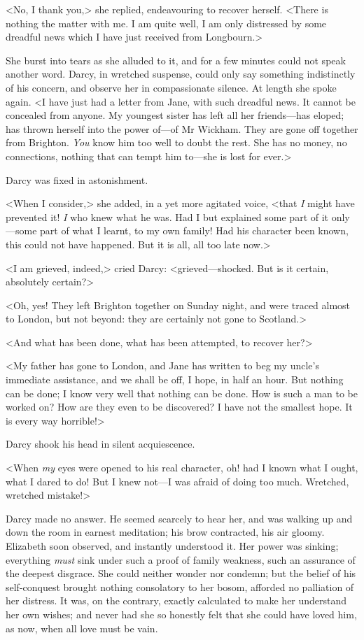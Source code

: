 <No, I thank you,> she replied, endeavouring to recover herself. <There is nothing the matter with me. I am quite well, I am only distressed by some dreadful news which I have just received from Longbourn.>

She burst into tears as she alluded to it, and for a few minutes could not speak another word. Darcy, in wretched suspense, could only say something indistinctly of his concern, and observe her in compassionate silence. At length she spoke again. <I have just had a letter from Jane, with such dreadful news. It cannot be concealed from anyone. My youngest sister has left all her friends—has eloped; has thrown herself into the power of—of Mr Wickham. They are gone off together from Brighton. \textit{You} know him too well to doubt the rest. She has no money, no connections, nothing that can tempt him to—she is lost for ever.>

Darcy was fixed in astonishment.

<When I consider,> she added, in a yet more agitated voice, <that \textit{I} might have prevented it! \textit{I} who knew what he was. Had I but explained some part of it only—some part of what I learnt, to my own family! Had his character been known, this could not have happened. But it is all, all too late now.>

<I am grieved, indeed,> cried Darcy: <grieved—shocked. But is it certain, absolutely certain?>

<Oh, yes! They left Brighton together on Sunday night, and were traced almost to London, but not beyond: they are certainly not gone to Scotland.>

<And what has been done, what has been attempted, to recover her?>

<My father has gone to London, and Jane has written to beg my uncle's immediate assistance, and we shall be off, I hope, in half an hour. But nothing can be done; I know very well that nothing can be done. How is such a man to be worked on? How are they even to be discovered? I have not the smallest hope. It is every way horrible!>

Darcy shook his head in silent acquiescence.

<When \textit{my} eyes were opened to his real character, oh! had I known what I ought, what I dared to do! But I knew not—I was afraid of doing too much. Wretched, wretched mistake!>

Darcy made no answer. He seemed scarcely to hear her, and was walking up and down the room in earnest meditation; his brow contracted, his air gloomy. Elizabeth soon observed, and instantly understood it. Her power was sinking; everything \textit{must} sink under such a proof of family weakness, such an assurance of the deepest disgrace. She could neither wonder nor condemn; but the belief of his self-conquest brought nothing consolatory to her bosom, afforded no palliation of her distress. It was, on the contrary, exactly calculated to make her understand her own wishes; and never had she so honestly felt that she could have loved him, as now, when all love must be vain.

